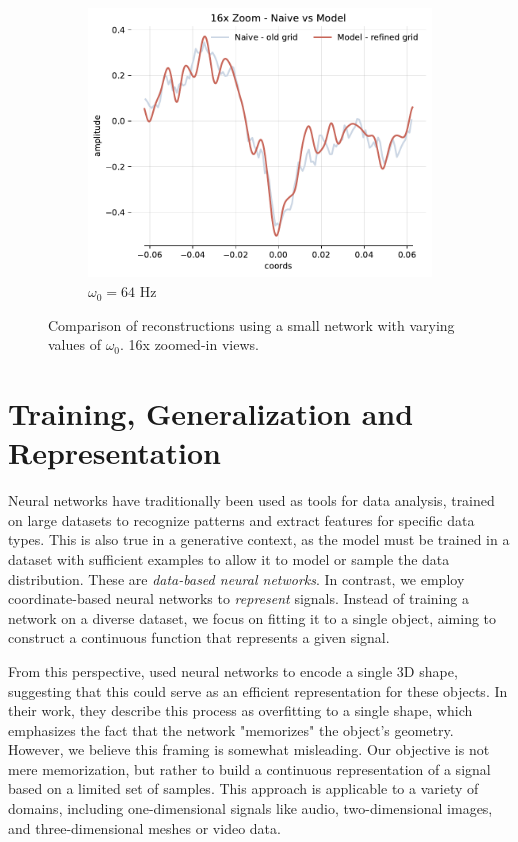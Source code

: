 \begin{figure}[h]
\begin{subfigure}[b]{0.32\textwidth}
        \centering
        \includegraphics[width=\textwidth]{img/ch3/16x_zoom-1hl-16hf-64hz.pdf}
        \caption{$\omega_0=64$ Hz}
    \end{subfigure}
    \caption{Comparison of reconstructions using a small network with varying values of $\omega_0$. 16x zoomed-in views.}
    \label{f:capacity-filter-16hf-increasing-omega}
\end{figure}

\section{Training, Generalization and Representation}
\label{sec:generalization}

Neural networks have traditionally been used as tools for data analysis, trained on large datasets to recognize patterns and extract features for specific data types. This is also true in a generative context, as the model must be trained in a dataset with sufficient examples to allow it to model or sample the data distribution. These are \textit{data-based neural networks}. In contrast, we employ coordinate-based neural networks to \textit{represent} signals. Instead of training a network on a diverse dataset, we focus on fitting it to a single object, aiming to construct a continuous function that represents a given signal.

From this perspective, \cite{davies2021effectivenessweightencodedneuralimplicit} used neural networks to encode a single 3D shape, suggesting that this could serve as an efficient representation for these objects. In their work, they describe this process as overfitting to a single shape, which emphasizes the fact that the network "memorizes" the object’s geometry. However, we believe this framing is somewhat misleading. Our objective is not mere memorization, but rather to build a continuous representation of a signal based on a limited set of samples. This approach is applicable to a variety of domains, including one-dimensional signals like audio, two-dimensional images, and three-dimensional meshes or video data.


